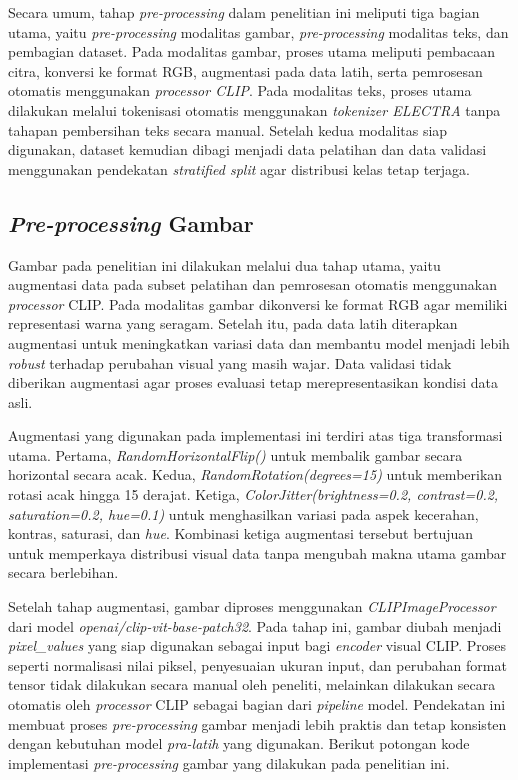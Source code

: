 Secara umum, tahap \textit{pre-processing} dalam penelitian ini meliputi tiga bagian utama, yaitu \textit{pre-processing} modalitas gambar, \textit{pre-processing} modalitas teks, dan pembagian dataset. Pada modalitas gambar, proses utama meliputi pembacaan citra, konversi ke format RGB, augmentasi pada data latih, serta pemrosesan otomatis menggunakan \textit{processor CLIP}. Pada modalitas teks, proses utama dilakukan melalui tokenisasi otomatis menggunakan \textit{tokenizer ELECTRA} tanpa tahapan pembersihan teks secara manual. Setelah kedua modalitas siap digunakan, dataset kemudian dibagi menjadi data pelatihan dan data validasi menggunakan pendekatan \textit{stratified split} agar distribusi kelas tetap terjaga.

\subsection{\textit{Pre-processing} Gambar} \label{IV.Preprocessing.Gambar}
Gambar pada penelitian ini dilakukan melalui dua tahap utama, yaitu augmentasi data pada subset pelatihan dan pemrosesan otomatis menggunakan \textit{processor} CLIP. Pada modalitas gambar dikonversi ke format RGB agar memiliki representasi warna yang seragam. Setelah itu, pada data latih diterapkan augmentasi untuk meningkatkan variasi data dan membantu model menjadi lebih \textit{robust} terhadap perubahan visual yang masih wajar. Data validasi tidak diberikan augmentasi agar proses evaluasi tetap merepresentasikan kondisi data asli.

Augmentasi yang digunakan pada implementasi ini terdiri atas tiga transformasi utama. Pertama, \textit{RandomHorizontalFlip()} untuk membalik gambar secara horizontal secara acak. Kedua, \textit{RandomRotation(degrees=15)} untuk memberikan rotasi acak hingga 15 derajat. Ketiga, \textit{ColorJitter(brightness=0.2, contrast=0.2, saturation=0.2, hue=0.1)} untuk menghasilkan variasi pada aspek kecerahan, kontras, saturasi, dan \textit{hue}. Kombinasi ketiga augmentasi tersebut bertujuan untuk memperkaya distribusi visual data tanpa mengubah makna utama gambar secara berlebihan.

Setelah tahap augmentasi, gambar diproses menggunakan \textit{CLIPImageProcessor} dari model \textit{openai/clip-vit-base-patch32}. Pada tahap ini, gambar diubah menjadi \textit{pixel\_values} yang siap digunakan sebagai input bagi \textit{encoder} visual CLIP. Proses seperti normalisasi nilai piksel, penyesuaian ukuran input, dan perubahan format tensor tidak dilakukan secara manual oleh peneliti, melainkan dilakukan secara otomatis oleh \textit{processor} CLIP sebagai bagian dari \textit{pipeline} model. Pendekatan ini membuat proses \textit{pre-processing} gambar menjadi lebih praktis dan tetap konsisten dengan kebutuhan model \textit{pra-latih} yang digunakan.
Berikut potongan kode implementasi \textit{pre-processing} gambar yang dilakukan pada penelitian ini.

